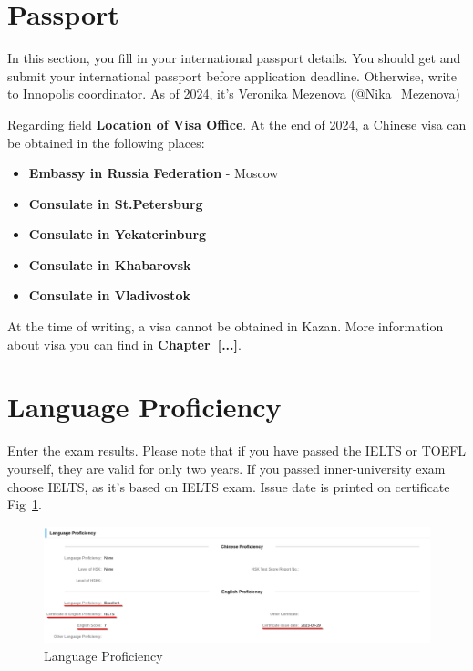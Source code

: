\section{Passport}\label{sec:ru_passport}

In this section, you fill in your international passport details.
You should get and submit your international passport before application deadline.
Otherwise, write to Innopolis coordinator.
As of 2024, it's Veronika Mezenova (@Nika\_Mezenova)

Regarding field \textbf{Location of Visa Office}.
At the end of 2024, a Chinese visa can be obtained in the following places:

\begin{itemize}
    \item \textbf{Embassy in Russia Federation} - Moscow
    \item \textbf{Consulate in St.Petersburg}
    \item \textbf{Consulate in Yekaterinburg}
    \item \textbf{Consulate in Khabarovsk}
    \item \textbf{Consulate in Vladivostok}
\end{itemize}


\begin{note}
    At the time of writing, a visa cannot be obtained in Kazan.
    More information about visa you can find in \textbf{Chapter~\ref{...}}.
\end{note}









\section{Language Proficiency}
Enter the exam results.
Please note that if you have passed the IELTS or TOEFL yourself,
they are valid for only two years.
If you passed inner-university exam choose IELTS, as it's based on IELTS exam.
Issue date is printed on certificate Fig~\ref{fig:ru_lang_prof}.


\begin{figure}[H]
    \centering
    \includegraphics[width=\textwidth]{russia/imgs/app_5_language}
    \caption{\centering Language Proficiency}
    \label{fig:ru_lang_prof}
\end{figure}









